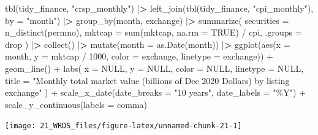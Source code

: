 \documentclass[
]{book}
\newenvironment{Shaded}{\begin{snugshade}}{\end{snugshade}}
\newcommand{\AttributeTok}[1]{\textcolor[rgb]{0.61,0.61,0.61}{#1}}
\newcommand{\ConstantTok}[1]{\textcolor[rgb]{0,0,0}{#1}}
\newcommand{\DecValTok}[1]{\textcolor[rgb]{0.06,0.06,0.06}{#1}}
\newcommand{\ErrorTok}[1]{\textcolor[rgb]{0.14,0.14,0.14}{\textbf{#1}}}
\newcommand{\FunctionTok}[1]{\textcolor[rgb]{0,0,0}{#1}}
\newcommand{\NormalTok}[1]{#1}
\newcommand{\SpecialCharTok}[1]{\textcolor[rgb]{0,0,0}{#1}}
\newcommand{\StringTok}[1]{\textcolor[rgb]{0.5,0.5,0.5}{#1}}
\begin{document}
\begin{Shaded}
\begin{Highlighting}[]
\FunctionTok{tbl}\NormalTok{(tidy\_finance, }\StringTok{"crsp\_monthly"}\NormalTok{) }\SpecialCharTok{|}\ErrorTok{\textgreater{}}
  \FunctionTok{left\_join}\NormalTok{(}\FunctionTok{tbl}\NormalTok{(tidy\_finance, }\StringTok{"cpi\_monthly"}\NormalTok{), }\AttributeTok{by =} \StringTok{"month"}\NormalTok{) }\SpecialCharTok{|}\ErrorTok{\textgreater{}}
  \FunctionTok{group\_by}\NormalTok{(month, exchange) }\SpecialCharTok{|}\ErrorTok{\textgreater{}}
  \FunctionTok{summarize}\NormalTok{(}
    \AttributeTok{securities =} \FunctionTok{n\_distinct}\NormalTok{(permno),}
    \AttributeTok{mktcap =} \FunctionTok{sum}\NormalTok{(mktcap, }\AttributeTok{na.rm =} \ConstantTok{TRUE}\NormalTok{) }\SpecialCharTok{/}\NormalTok{ cpi,}
    \AttributeTok{.groups =} \StringTok{\textquotesingle{}drop\textquotesingle{}}
\NormalTok{  ) }\SpecialCharTok{|}\ErrorTok{\textgreater{}}
  \FunctionTok{collect}\NormalTok{() }\SpecialCharTok{|}\ErrorTok{\textgreater{}}
  \FunctionTok{mutate}\NormalTok{(}\AttributeTok{month =} \FunctionTok{as.Date}\NormalTok{(month)) }\SpecialCharTok{|}\ErrorTok{\textgreater{}}
  \FunctionTok{ggplot}\NormalTok{(}\FunctionTok{aes}\NormalTok{(}\AttributeTok{x =}\NormalTok{ month, }\AttributeTok{y =}\NormalTok{ mktcap }\SpecialCharTok{/} \DecValTok{1000}\NormalTok{, }\AttributeTok{color =}\NormalTok{ exchange, }\AttributeTok{linetype =}\NormalTok{ exchange)) }\SpecialCharTok{+}
  \FunctionTok{geom\_line}\NormalTok{() }\SpecialCharTok{+}
  \FunctionTok{labs}\NormalTok{(}
    \AttributeTok{x =} \ConstantTok{NULL}\NormalTok{, }\AttributeTok{y =} \ConstantTok{NULL}\NormalTok{, }\AttributeTok{color =} \ConstantTok{NULL}\NormalTok{, }\AttributeTok{linetype =} \ConstantTok{NULL}\NormalTok{,}
    \AttributeTok{title =} \StringTok{"Monthly total market value (billions of Dec 2020 Dollars) by listing exchange"}
\NormalTok{  ) }\SpecialCharTok{+}
  \FunctionTok{scale\_x\_date}\NormalTok{(}\AttributeTok{date\_breaks =} \StringTok{"10 years"}\NormalTok{, }\AttributeTok{date\_labels =} \StringTok{"\%Y"}\NormalTok{) }\SpecialCharTok{+}
  \FunctionTok{scale\_y\_continuous}\NormalTok{(}\AttributeTok{labels =}\NormalTok{ comma)}
\end{Highlighting}
\end{Shaded}

\begin{center}\texttt{[image: 21\_WRDS\_files/figure-latex/unnamed-chunk-21-1]} \end{center}
\end{document}
